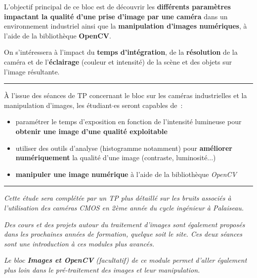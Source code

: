 \documentclass[a4paper,11pt,titlepage]{article} %
\begin{document}
L'objectif principal de ce bloc est de découvrir les \textbf{différents paramètres impactant la qualité d'une prise d'image par une caméra} dans un environnement industriel ainsi que la \textbf{manipulation d'images numériques}, à l'aide de la bibliothèque \textbf{OpenCV}.

On s'intéressera à l'impact du \textbf{temps d'intégration}, de la \textbf{résolution} de la caméra et de l'\textbf{éclairage} (couleur et intensité) de la scène et des objets sur l'image résultante. 


\noindent \rule{\linewidth}{1pt}

\medskip


À l'issue des séances de TP concernant le bloc sur les caméras industrielles et la manipulation d'images, les étudiant$\cdot$es seront capables de~:

\begin{itemize}
	\item paramétrer le temps d'exposition en fonction de l'intensité lumineuse pour \textbf{obtenir une image d'une qualité exploitable}
	\item utiliser des outils d'analyse (histogramme notamment) pour \textbf{améliorer numériquement} la qualité d'une image (contraste, luminosité...)
	\item \textbf{manipuler une image numérique} à l'aide de la bibliothèque \textsl{OpenCV}
\end{itemize}

\noindent \rule{\linewidth}{1pt}


\textit{Cette étude sera complétée par un TP plus détaillé sur les bruits associés à l'utilisation des caméras CMOS en 2ème année du cycle ingénieur à Palaiseau.}

\textit{Des cours et des projets autour du traitement d'images sont également proposés dans les prochaines années de formation, quelque soit le site. Ces deux séances sont une introduction à ces modules plus avancés.}

\textit{Le bloc \textbf{Images et OpenCV} (facultatif) de ce module permet d'aller également plus loin dans le pré-traitement des images et leur manipulation.}


\end{document}

